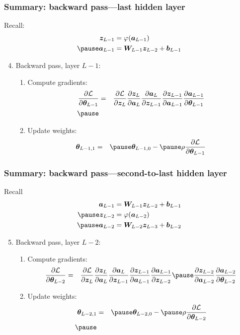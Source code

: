 \documentclass[smaller]{beamer}
\begin{document}
\begin{frame}
  \frametitle{Summary: backward pass---last hidden layer}
  \pe
  Recall: \pe
              \begin{align}
                \bm z_{L-1} &= \varphi(\bm a_{L-1}) \\\pe
                \bm a_{L-1} &= \bm W_{L-1} \bm z_{L-2} + \bm b_{L-1}
      \end{align}\pe
  \begin{enumerate}[<+->]\setcounter{enumi}{3}
  \item Backward pass, layer $L-1$:\pause
    \begin{enumerate}[a]
    \item Compute gradients: \pause
    \begin{eqnarray}
      \pd{\mc{L}}{\bm\th_{L-1}} &=& \pd{\mc{L}}{\bm z_{L}}\pd{\bm z_{L}}{\bm a_{L}}\pd{\bm a_{L}}{\bm z_{L-1}}
    \pd{\bm z_{L-1}}{\bm a_{L-1}}\pd{\bm a_{L-1}}{\bm\th_{L-1}}
      \\\pause
     \end{eqnarray}
    \pause
  \item Update weights: \pause
    \begin{eqnarray}
      \bm\th_{L-1, 1}  &=& \pause  \bm\th_{L-1,0} - \pause \rho \pd{\mc{L}}{\bm\th_{L-1}}  
    \end{eqnarray}
  \end{enumerate}
  \end{enumerate}
\end{frame}

\begin{frame}
  \frametitle{Summary: backward pass---second-to-last hidden layer}
  \pe
  Recall
  \pe
  \begin{align}
    \bm a_{L-1} &= \bm W_{L-1} \bm z_{L-2} + \bm b_{L-1} \\\pe
    \bm z_{L-2} &= \varphi(\bm a_{L-2}) \\\pe
    \bm a_{L-2} &=  \bm W_{L-2} \bm z_{L-3} + \bm b_{L-2} 
  \end{align}\pe
  \begin{enumerate}[<+->]\setcounter{enumi}{4}
  \item Backward pass, layer $L-2$:\pause
    \begin{enumerate}[a]
    \item Compute gradients: \pause
    \begin{eqnarray}
      \pd{\mc{L}}{\bm\th_{L-2}} &=&  \pd{\mc{L}}{\bm z_{L}}\pd{\bm z_{L}}{\bm a_{L}}\pd{\bm a_{L}}{\bm z_{L-1}}
    \pd{\bm z_{L-1}}{\bm a_{L-1}}\pd{\bm a_{L-1}}{\bm z_{L-2}}\pause
                        \pd{\bm z_{L-2}}{\bm a_{L-2}}\pd{\bm a_{L-2}}{\bm\th_{L-2}}
    \end{eqnarray}
    \pause
  \item Update weights: \pause
    \begin{eqnarray}
      \bm\th_{L-2, 1}  &=& \pause  \bm\th_{L-2,0} - \pause \rho \pd{\mc{L}}{\bm\th_{L-2}}  \\\pause
    \end{eqnarray}
  \end{enumerate}
  \end{enumerate}
\end{frame}
\end{document}
